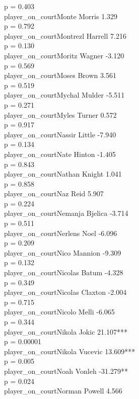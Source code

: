 \documentclass[
  landscape]{article}
\begin{document}
p = 0.403\\
player\_on\_courtMonte Morris 1.329\\
p = 0.792\\
player\_on\_courtMontrezl Harrell 7.216\\
p = 0.130\\
player\_on\_courtMoritz Wagner -3.120\\
p = 0.569\\
player\_on\_courtMoses Brown 3.561\\
p = 0.519\\
player\_on\_courtMychal Mulder -5.511\\
p = 0.271\\
player\_on\_courtMyles Turner 0.572\\
p = 0.917\\
player\_on\_courtNassir Little -7.940\\
p = 0.134\\
player\_on\_courtNate Hinton -1.405\\
p = 0.843\\
player\_on\_courtNathan Knight 1.041\\
p = 0.858\\
player\_on\_courtNaz Reid 5.907\\
p = 0.224\\
player\_on\_courtNemanja Bjelica -3.714\\
p = 0.511\\
player\_on\_courtNerlens Noel -6.096\\
p = 0.209\\
player\_on\_courtNico Mannion -9.309\\
p = 0.132\\
player\_on\_courtNicolas Batum -4.328\\
p = 0.349\\
player\_on\_courtNicolas Claxton -2.004\\
p = 0.715\\
player\_on\_courtNicolo Melli -6.065\\
p = 0.344\\
player\_on\_courtNikola Jokic 21.107***\\
p = 0.00001\\
player\_on\_courtNikola Vucevic 13.609***\\
p = 0.005\\
player\_on\_courtNoah Vonleh -31.279**\\
p = 0.024\\
player\_on\_courtNorman Powell 4.566\\
\end{document}
